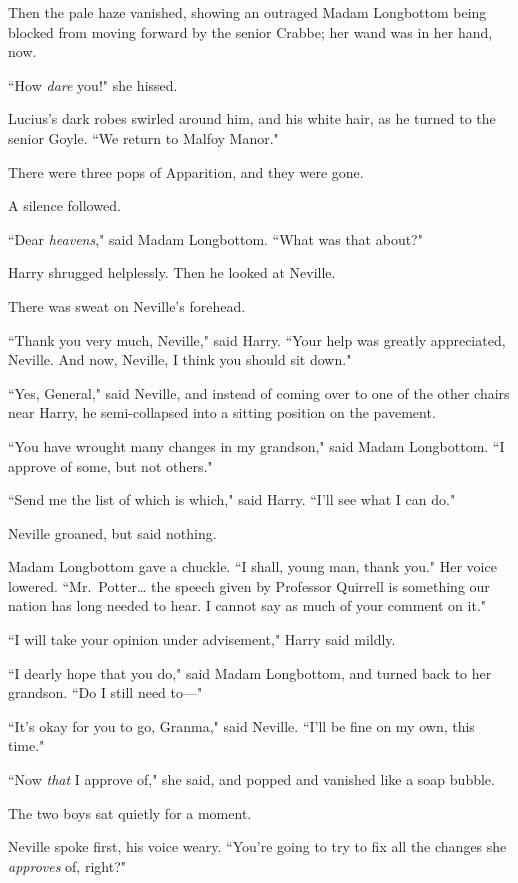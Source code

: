 Then the pale haze vanished, showing an outraged Madam Longbottom being blocked from moving forward by the senior Crabbe; her wand was in her hand, now.

``How \emph{dare} you!" she hissed.

Lucius's dark robes swirled around him, and his white hair, as he turned to the senior Goyle. ``We return to Malfoy Manor."

There were three pops of Apparition, and they were gone.

A silence followed.

``Dear \emph{heavens}," said Madam Longbottom. ``What was that about?"

Harry shrugged helplessly. Then he looked at Neville.

There was sweat on Neville's forehead.

``Thank you very much, Neville," said Harry. ``Your help was greatly appreciated, Neville. And now, Neville, I think you should sit down."

``Yes, General," said Neville, and instead of coming over to one of the other chairs near Harry, he semi-collapsed into a sitting position on the pavement.

``You have wrought many changes in my grandson," said Madam Longbottom. ``I approve of some, but not others."

``Send me the list of which is which," said Harry. ``I'll see what I can do."

Neville groaned, but said nothing.

Madam Longbottom gave a chuckle. ``I shall, young man, thank you." Her voice lowered. ``Mr.~Potter{\ldots} the speech given by Professor Quirrell is something our nation has long needed to hear. I cannot say as much of your comment on it."

``I will take your opinion under advisement," Harry said mildly.

``I dearly hope that you do," said Madam Longbottom, and turned back to her grandson. ``Do I still need to---"

``It's okay for you to go, Granma," said Neville. ``I'll be fine on my own, this time."

``Now \emph{that} I approve of," she said, and popped and vanished like a soap bubble.

The two boys sat quietly for a moment.

Neville spoke first, his voice weary. ``You're going to try to fix all the changes she \emph{approves} of, right?"


